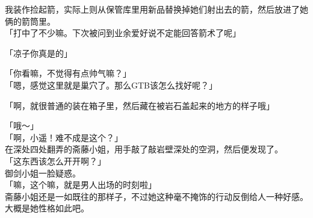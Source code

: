 我装作捡起箭，实际上则从保管库里用新品替换掉她们射出去的箭，然后放进了她俩的箭筒里。\\

「打中了不少嘛。下次被问到业余爱好说不定能回答箭术了呢」

「凉子你真是的」

「你看嘛，不觉得有点帅气嘛？」\\

「嗯，感觉这里就是巢穴了。那么GTB该怎么找好呢？」

「啊，就很普通的装在箱子里，然后藏在被岩石盖起来的地方的样子哦」

「哦～」\\

「啊，小遥！难不成是这个？」\\

在深处四处翻弄的斋藤小姐，用手敲了敲岩壁深处的空洞，然后便发现了。\\

「这东西该怎么开开啊？」\\

御剑小姐一脸疑惑。\\

「嘛，这个嘛，就是男人出场的时刻啦」\\

斋藤小姐还是一如既往的那样子，不过她这种毫不掩饰的行动反倒给人一种好感。大概是她性格如此吧。\\

